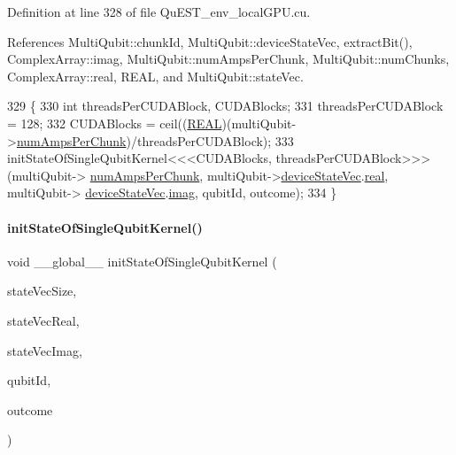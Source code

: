 Definition at line 328 of file Qu\+E\+S\+T\+\_\+env\+\_\+local\+G\+P\+U.\+cu.



References Multi\+Qubit\+::chunk\+Id, Multi\+Qubit\+::device\+State\+Vec, extract\+Bit(), Complex\+Array\+::imag, Multi\+Qubit\+::num\+Amps\+Per\+Chunk, Multi\+Qubit\+::num\+Chunks, Complex\+Array\+::real, R\+E\+AL, and Multi\+Qubit\+::state\+Vec.


\begin{DoxyCode}
329 \{
330     \textcolor{keywordtype}{int} threadsPerCUDABlock, CUDABlocks;
331     threadsPerCUDABlock = 128;
332     CUDABlocks = ceil((\mbox{\hyperlink{QuEST__precision_8h_a4b654506f18b8bfd61ad2a29a7e38c25}{REAL}})(multiQubit->\mbox{\hyperlink{structMultiQubit_a1cad83601a78635dd278259c7ed54f18}{numAmpsPerChunk}})/threadsPerCUDABlock);
333     initStateOfSingleQubitKernel<<<CUDABlocks, threadsPerCUDABlock>>>(multiQubit->
      \mbox{\hyperlink{structMultiQubit_a1cad83601a78635dd278259c7ed54f18}{numAmpsPerChunk}}, multiQubit->\mbox{\hyperlink{structMultiQubit_a59ac613486a41b8c9a4b6e79cc8d2cc3}{deviceStateVec}}.\mbox{\hyperlink{structComplexArray_a4195cac6c784ea1b6271f1c7dba1548a}{real}}, multiQubit->
      \mbox{\hyperlink{structMultiQubit_a59ac613486a41b8c9a4b6e79cc8d2cc3}{deviceStateVec}}.\mbox{\hyperlink{structComplexArray_a79dde47c7ae530c79cebfdf57b225968}{imag}}, qubitId, outcome);
334 \}
\end{DoxyCode}
\mbox{\label{QuEST__env__localGPU_8cu_a1eb51dd82f1cbbef94d3cb7d2ca73e28}} 
\paragraph{\texorpdfstring{init\+State\+Of\+Single\+Qubit\+Kernel()}{initStateOfSingleQubitKernel()}}
{\footnotesize\ttfamily void \+\_\+\+\_\+global\+\_\+\+\_\+ init\+State\+Of\+Single\+Qubit\+Kernel (\begin{DoxyParamCaption}\item[{long long int}]{state\+Vec\+Size,  }\item[{\mbox{\hyperlink{QuEST__precision_8h_a4b654506f18b8bfd61ad2a29a7e38c25}{R\+E\+AL}} $\ast$}]{state\+Vec\+Real,  }\item[{\mbox{\hyperlink{QuEST__precision_8h_a4b654506f18b8bfd61ad2a29a7e38c25}{R\+E\+AL}} $\ast$}]{state\+Vec\+Imag,  }\item[{int}]{qubit\+Id,  }\item[{int}]{outcome }\end{DoxyParamCaption})}



